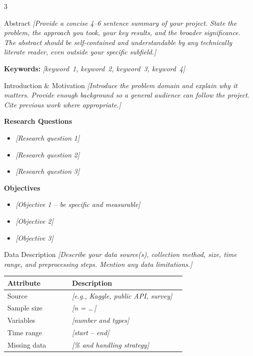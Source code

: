 \documentclass[a0,portrait]{a0poster}
\begin{document}
\begin{multicols}{3}

\begin{posterblock}{Abstract}
\textit{[Provide a concise 4--6 sentence summary of your project. State the
problem, the approach you took, your key results, and the broader significance.
The abstract should be self-contained and understandable by any technically
literate reader, even outside your specific subfield.]}

\vspace{0.5em}
\textbf{Keywords:} \textit{[keyword~1, keyword~2, keyword~3, keyword~4]}
\end{posterblock}

\begin{posterblock}{Introduction \& Motivation}
\textit{[Introduce the problem domain and explain why it matters. Provide
enough background so a general audience can follow the project. Cite previous
work where appropriate.]}

\vspace{0.5em}
\textbf{Research Questions}
\begin{itemize}[leftmargin=1.4em,itemsep=4pt,topsep=4pt]
  \item \textit{[Research question 1]}
  \item \textit{[Research question 2]}
  \item \textit{[Research question 3]}
\end{itemize}

\vspace{0.3em}
\textbf{Objectives}
\begin{itemize}[leftmargin=1.4em,itemsep=4pt,topsep=4pt]
  \item \textit{[Objective 1 -- be specific and measurable]}
  \item \textit{[Objective 2]}
  \item \textit{[Objective 3]}
\end{itemize}
\end{posterblock}

\begin{posterblock}{Data Description}
\textit{[Describe your data source(s), collection method, size, time range,
and preprocessing steps. Mention any data limitations.]}

\vspace{0.6em}
\renewcommand{\arraystretch}{1.35}
\begin{tabular}{@{}p{0.34\linewidth}p{0.60\linewidth}@{}}
\toprule
\textbf{Attribute} & \textbf{Description} \\
\midrule
Source         & \textit{[e.g., Kaggle, public API, survey]} \\
Sample size    & \textit{[n = \ldots\,]} \\
Variables      & \textit{[number and types]} \\
Time range     & \textit{[start -- end]} \\
Missing data   & \textit{[\% and handling strategy]} \\
\bottomrule
\end{tabular}
\end{posterblock}


\end{multicols}
\end{document}
